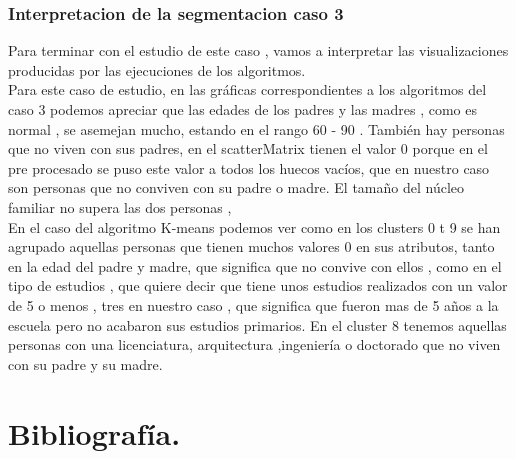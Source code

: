 
	\subsubsection[Interpretacion de la segmentacion caso 3]{Interpretacion de la segmentacion caso 3}

	Para terminar con el estudio de este caso , vamos a interpretar las visualizaciones producidas
	por las ejecuciones de los algoritmos. \\

	Para este caso de estudio, en las gráficas correspondientes a los algoritmos del caso 3
	podemos apreciar que las edades de los padres y las madres , como es normal , se asemejan mucho,
	estando en el rango 60 - 90 . También hay personas que no viven con sus padres, en el scatterMatrix
	tienen el valor 0 porque en el pre procesado se puso este valor a todos los huecos vacíos, que en nuestro caso 
	son personas que no conviven con su padre o madre. El tamaño del núcleo familiar no supera las dos personas , \\

	En el caso del algoritmo K-means podemos ver como en los clusters 0 t 9 se han agrupado aquellas personas que 
	tienen muchos valores 0 en sus atributos, tanto en la edad del padre y madre, que significa que no convive
	con ellos , como en el tipo de estudios , que quiere decir que tiene unos estudios realizados
	con un valor de 5 o menos , tres en nuestro caso , que significa que fueron mas de 5 años a la
	escuela pero no acabaron sus estudios primarios. En el cluster 8 tenemos aquellas personas
	con una licenciatura, arquitectura ,ingeniería o doctorado que no viven con su padre y su madre.\\


	\section[Bibliografía]{Bibliografía.}
	
